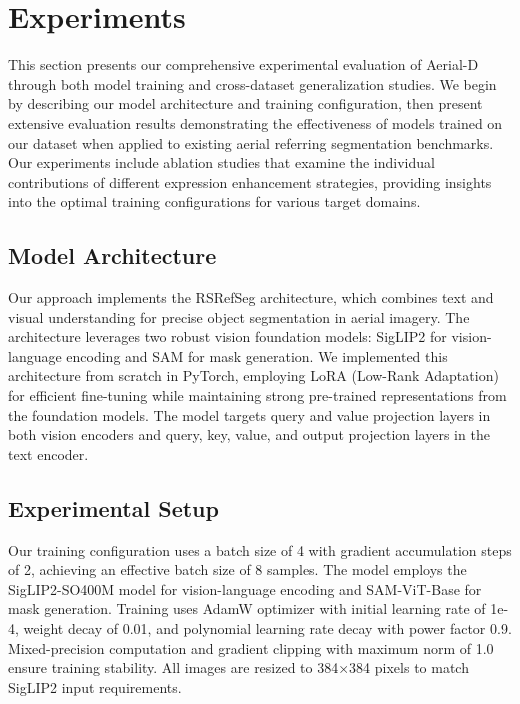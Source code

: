 
\section{Experiments}
\label{sec:experiments}

This section presents our comprehensive experimental evaluation of Aerial-D through both model training and cross-dataset generalization studies. We begin by describing our model architecture and training configuration, then present extensive evaluation results demonstrating the effectiveness of models trained on our dataset when applied to existing aerial referring segmentation benchmarks. Our experiments include ablation studies that examine the individual contributions of different expression enhancement strategies, providing insights into the optimal training configurations for various target domains.

\subsection{Model Architecture}
\label{subsec:model_architecture}

Our approach implements the RSRefSeg architecture, which combines text and visual understanding for precise object segmentation in aerial imagery. The architecture leverages two robust vision foundation models: SigLIP2 for vision-language encoding and SAM for mask generation. We implemented this architecture from scratch in PyTorch, employing LoRA (Low-Rank Adaptation) for efficient fine-tuning while maintaining strong pre-trained representations from the foundation models. The model targets query and value projection layers in both vision encoders and query, key, value, and output projection layers in the text encoder.

\subsection{Experimental Setup}
\label{subsec:experimental_setup}

Our training configuration uses a batch size of 4 with gradient accumulation steps of 2, achieving an effective batch size of 8 samples. The model employs the SigLIP2-SO400M model for vision-language encoding and SAM-ViT-Base for mask generation. Training uses AdamW optimizer with initial learning rate of 1e-4, weight decay of 0.01, and polynomial learning rate decay with power factor 0.9. Mixed-precision computation and gradient clipping with maximum norm of 1.0 ensure training stability. All images are resized to 384×384 pixels to match SigLIP2 input requirements.

